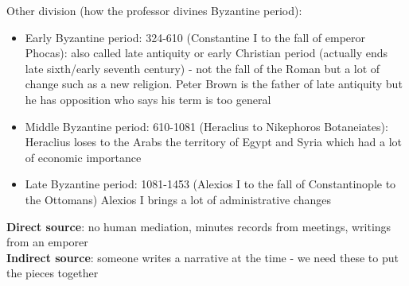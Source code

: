 \documentclass{article}
\begin{document}
Other division (how the professor divines Byzantine period):
\begin{itemize}
\item Early Byzantine period: 324-610 (Constantine I to the fall of emperor Phocas): also called late antiquity or early Christian period (actually ends late sixth/early seventh century) - not the fall of the Roman but a lot of change such as a new religion. Peter Brown is the father of late antiquity but he has opposition who says his term is too general
\item	Middle Byzantine period: 610-1081 (Heraclius to Nikephoros Botaneiates): Heraclius loses to the Arabs the territory of Egypt and Syria  which had a lot of economic importance 
\item	Late Byzantine period: 1081-1453 (Alexios I to the fall of Constantinople to the Ottomans) Alexios I brings a lot of administrative changes
\end{itemize}
\textbf{Direct source}: no human mediation, minutes records from meetings, writings from an emporer \\
\textbf{Indirect source}: someone writes a narrative at the time - we need these to put the pieces together\\
\end{document}
